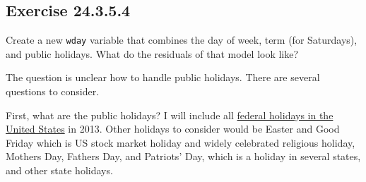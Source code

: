 \documentclass[]{book}
\newenvironment{Shaded}{\begin{snugshade}}{\end{snugshade}}
\newcommand{\DataTypeTok}[1]{\textcolor[rgb]{0.13,0.29,0.53}{#1}}
\newcommand{\DecValTok}[1]{\textcolor[rgb]{0.00,0.00,0.81}{#1}}
\newcommand{\KeywordTok}[1]{\textcolor[rgb]{0.13,0.29,0.53}{\textbf{#1}}}
\newcommand{\NormalTok}[1]{#1}
\newcommand{\OperatorTok}[1]{\textcolor[rgb]{0.81,0.36,0.00}{\textbf{#1}}}
\newcommand{\StringTok}[1]{\textcolor[rgb]{0.31,0.60,0.02}{#1}}
\theoremstyle{plain}
\theoremstyle{remark}
\begin{document}
\hypertarget{exercise-24.3.5.4}{%
\subsection*{\texorpdfstring{Exercise
{24.3.5.4}}{Exercise 24.3.5.4}}\label{exercise-24.3.5.4}}

Create a new \texttt{wday} variable that combines the day of week, term
(for Saturdays), and public holidays. What do the residuals of that
model look like?

The question is unclear how to handle public holidays. There are several
questions to consider.

First, what are the public holidays? I will include all
\href{https://en.wikipedia.org/wiki/Federal_holidays_in_the_United_States}{federal
holidays in the United States} in 2013. Other holidays to consider would
be Easter and Good Friday which is US stock market holiday and widely
celebrated religious holiday, Mothers Day, Fathers Day, and Patriots'
Day, which is a holiday in several states, and other state holidays.

\begin{Shaded}
\end{Shaded}
\end{document}

